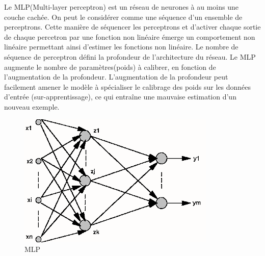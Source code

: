 Le MLP(Multi-layer perceptron) est un réseau de neurones à au moins une couche cachée. On peut le considérer comme une séquence d'un ensemble de perceptrons. Cette manière de séquencer les perceptrons et d'activer chaque sortie de chaque percetron par une fonction non linéaire émerge un comportement non linéaire permettant ainsi d'estimer les fonctions non linéaire. Le nombre de séquence de perceptron défini la profondeur de l'architecture du réseau. Le MLP augmente le nombre de paramètres(poids) à calibrer, en fonction de l'augmentation de la profondeur. L'augmentation de la profondeur peut facilement amener le modèle à spécialiser le calibrage des poids sur les données d'entrée (sur-apprentissage), ce qui entraîne une mauvaise estimation d'un nouveau exemple.  
\begin{figure}[H]
    \centering
    \includegraphics[scale = 0.5]{images/multicouche.png}
    \caption{MLP}
    \label{mlp}
\end{figure}

